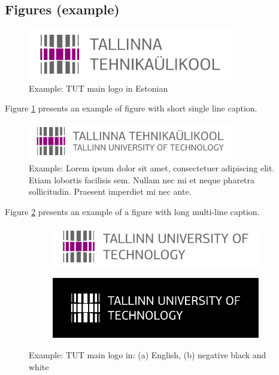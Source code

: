 \subsection{Figures (example)}


\begin{figure}[!ht]
  \centering
  \includegraphics[width=0.8\textwidth]{figures/TTU_peamine_logo_EST_print}
  \caption{ Example: TUT main logo in Estonian}
  \label{fig:logo}
\end{figure}

Figure \ref{fig:logo} presents an example of figure with short single
line caption.

\begin{figure}[!ht]
  \centering
  \includegraphics[width=0.8\textwidth]{figures/TTU_alternatiivne_logo_EST_ENG_print}
  \caption{Example: Lorem ipsum dolor sit amet, consectetuer
    adipiscing elit. Etiam lobortis facilisis sem. Nullam nec mi et
    neque pharetra sollicitudin. Praesent imperdiet mi nec ante.
  }
  \label{fig:logo2}
\end{figure}

Figure \ref{fig:logo2} presents an example of a figure with long multi-line caption.


\begin{figure}[!ht]
  \centering
  \begin{subfigure}[b]{0.45\textwidth}
    \includegraphics[width=\textwidth]{figures/TTU_peamine_logo_ENG_print}
    \caption{}
  \end{subfigure}
  \qquad
  \begin{subfigure}[b]{0.45\textwidth}
    \includegraphics[width=\textwidth]{figures/ttu_peamine_logo_eng_must-valge_negatiivis}
    \caption{}
  \end{subfigure}
  \caption{Example: TUT main logo in: (a) English, (b) negative black and white}
  \label{fig:logo3}
\end{figure}

